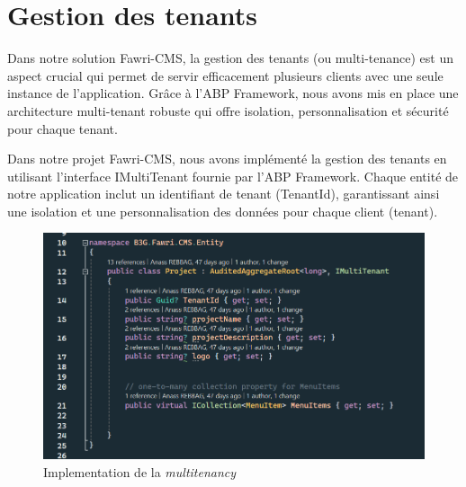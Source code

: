 \section{Gestion des tenants}

\hspace{\parindent}Dans notre solution Fawri-CMS, la gestion des tenants (ou multi-tenance) est un aspect crucial qui permet de servir efficacement plusieurs clients avec une seule instance de l'application. Grâce à l'ABP Framework, nous avons mis en place une architecture multi-tenant robuste qui offre isolation, personnalisation et sécurité pour chaque tenant.

Dans notre projet Fawri-CMS, nous avons implémenté la gestion des tenants en utilisant l'interface IMultiTenant fournie par l'ABP Framework. Chaque entité de notre application inclut un identifiant de tenant (TenantId), garantissant ainsi une isolation et une personnalisation des données pour chaque client (tenant).


\begin{figure}[H] 
    \centering
    \includegraphics[width=13cm]{Figures/tenant code.PNG}
    \caption{Implementation de la \textit{multitenancy}}
\end{figure}



